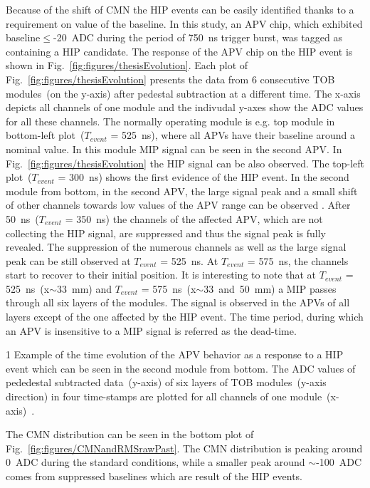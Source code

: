 Because of the shift of CMN the HIP events can be easily identified thanks to a requirement on value of the baseline. In this study, an APV chip, which exhibited baseline$\leq$-20~ADC during the period of 750~ns trigger burst, was tagged as containing a  HIP candidate. The response of the APV chip on the HIP event is shown in Fig.~\ref{fig:figures/thesisEvolution}. Each plot of Fig.~\ref{fig:figures/thesisEvolution} presents the data from 6 consecutive TOB modules~(on the y-axis) after pedestal subtraction at a different time. The x-axis depicts all channels of one module and the indivudal y-axes show the ADC values for all these channels. The normally operating module is e.g. top module in bottom-left plot~($T_{event}$ = 525~ns), where all APVs have their baseline around a nominal value. In this module MIP signal can be seen in the second APV. In Fig.~\ref{fig:figures/thesisEvolution} the HIP signal can be also observed. The top-left plot~($T_{event}$ = 300~ns) shows the first evidence of the HIP event. In the second module from bottom, in the second APV, the large signal peak and a small shift of other channels towards low values of the APV range can be observed . After 50~ns~($T_{event}$ = 350~ns) the channels of the affected APV, which are not collecting the HIP signal, are suppressed and thus the signal peak is fully revealed. The suppression of the numerous channels as well as the large signal peak can be still observed at $T_{event}$ = 525~ns. At $T_{event}$ = 575~ns, the channels start to recover to their initial position. It is interesting to note that at $T_{event}$ = 525~ns~(x$\sim$33~mm) and $T_{event}$ = 575~ns~(x$\sim$33~and~50~mm) a MIP passes through all six layers of the modules. The signal is observed in the APVs of all layers except of the one affected by the HIP event. The time period, during which an APV is insensitive to a MIP signal is referred as the dead-time.

                 {1}       %
                 {Example of the time evolution of the APV behavior as a response to a HIP event which can be seen in the second module from bottom. The ADC values of pededestal subtracted data~(y-axis) of six layers of TOB modules~(y-axis direction) in four time-stamps are plotted for all channels of one module~(x-axis)~\cite{Bainbridge:2004jc}.} %

The CMN distribution can be seen in the bottom plot of Fig.~\ref{fig:figures/CMNandRMSrawPast}. The CMN distribution is peaking around 0~ADC during the standard conditions, while a smaller peak around $\sim$-100~ADC comes from suppressed baselines which are result of the HIP events. 

